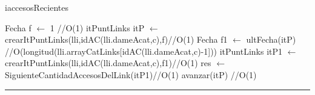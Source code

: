 \begin{algorithm}[H]
\caption{iaccesosRecientes}
\begin{algorithmic}[1]
\state Fecha f $\gets$ 1 \hfill//O(1)
\state itPuntLinks itP $\gets$ crearItPuntLinks(lli,idAC(lli.dameAcat,c),f)\hfill//O(1)
\state Fecha f1 $\gets$ ultFecha(itP) \hfill //O(longitud(lli.arrayCatLinks[idAC(lli.dameAcat,c)-1]))
\state itPuntLinks itP1 $\gets$ crearItPuntLinks(lli,idAC(lli.dameAcat,c),f1)\hfill//O(1)
\state res $\gets$ SiguienteCantidadAccesosDelLink(itP1)\hfill//O(1)
\endif
\state avanzar(itP) \hfill//O(1)
\endwhile
\EndFunction 
\end{algorithmic}
\hrule
{}
\end{algorithm}